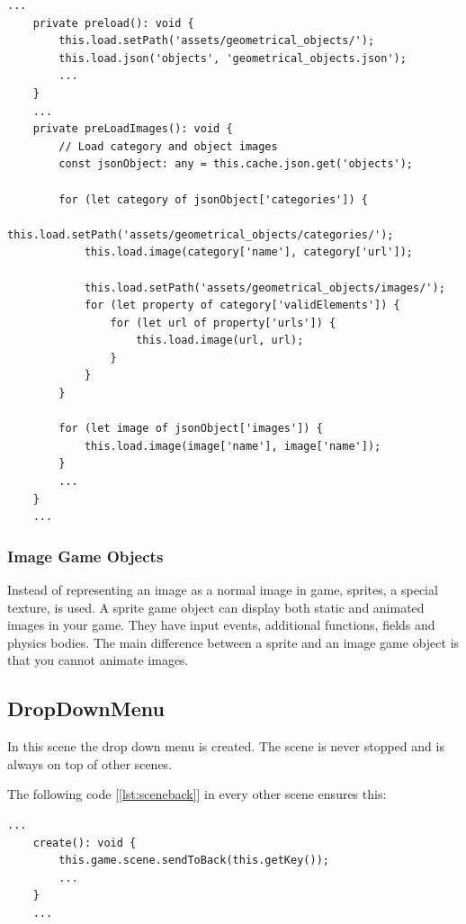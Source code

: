 \begin{lstlisting}[style=TypeScript, caption={preloadAsset.ts}, label={lst:jsonpreload}]
    ...
    private preload(): void {
        this.load.setPath('assets/geometrical_objects/');
        this.load.json('objects', 'geometrical_objects.json');
        ...
    }
    ...
    private preLoadImages(): void {
        // Load category and object images
        const jsonObject: any = this.cache.json.get('objects');

        for (let category of jsonObject['categories']) {
            this.load.setPath('assets/geometrical_objects/categories/');
            this.load.image(category['name'], category['url']);

            this.load.setPath('assets/geometrical_objects/images/');
            for (let property of category['validElements']) {
                for (let url of property['urls']) {
                    this.load.image(url, url);
                }
            }
        }

        for (let image of jsonObject['images']) {
            this.load.image(image['name'], image['name']);
        }
        ...
    }
    ...
\end{lstlisting}

\subsubsection{Image Game Objects}
Instead of representing an image as a normal image in game, sprites, a special texture, is used.
A sprite game object can display both static and animated images in your game.
They have input events, additional functions, fields and physics bodies.
The main difference between a sprite and an image game object is that you cannot animate images.

\subsection{DropDownMenu}\label{subsec:dropdownmenu}
In this scene the drop down menu is created.
The scene is never stopped and is always on top of other scenes.

The following code [\ref{lst:sceneback}] in every other scene ensures this:
\begin{lstlisting}[style=TypeScript, caption={Send current scene to back}, label={lst:sceneback}]
    ...
    create(): void {
        this.game.scene.sendToBack(this.getKey());
        ...
    }
    ...
\end{lstlisting}

